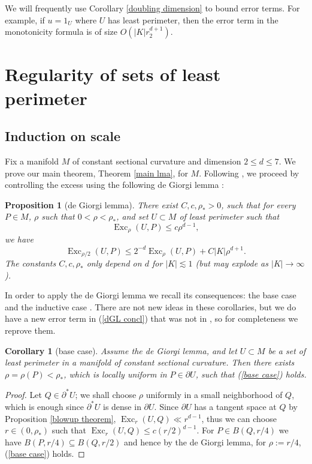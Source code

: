 \documentclass[reqno,11pt]{amsart}
\DeclareMathOperator{\Exc}{Exc}
\newtheorem{proposition}[theorem]{Proposition}
\newtheorem{corollary}[theorem]{Corollary}
\theoremstyle{definition}
\numberwithin{equation}{section}
\begin{document}
We will frequently use Corollary \ref{doubling dimension} to bound error terms.
For example, if $u = 1_U$ where $U$ has least perimeter, then the error term in the monotonicity formula is of size $O(|K|r_2^{d + 1})$.



\section{Regularity of sets of least perimeter}\label{Plateau section}
\subsection{Induction on scale}
Fix a manifold $M$ of constant sectional curvature and dimension $2 \leq d \leq 7$.
We prove our main theorem, Theorem \ref{main lma}, for $M$.
Following \cite{Miranda66,Giusti77,deGiorgi61}, we proceed by controlling the excess using the following de Giorgi lemma \cite[Theorem 8.1]{Giusti77}:

\begin{proposition}[de Giorgi lemma]\label{de Giorgi}
There exist $C, c, \rho_* > 0$, such that for every $P \in M$, $\rho$ such that $0 < \rho < \rho_*$, and set $U \subset M$ of least perimeter such that
\begin{equation}\label{base case}
\Exc_\rho(U, P) \leq c\rho^{d - 1},
\end{equation}
we have
\begin{equation}\label{dGL concl}
\Exc_{\rho/2}(U, P) \leq 2^{-d} \Exc_\rho(U, P) + C|K|\rho^{d + 1}.
\end{equation}
The constants $C, c, \rho_*$ only depend on $d$ for $|K| \lesssim 1$ (but may explode as $|K| \to \infty$).
\end{proposition}

In order to apply the de Giorgi lemma we recall its consequences: the base case \cite[pg109]{Giusti77} and the inductive case \cite[Corollary 8.3]{Giusti77}.
There are not new ideas in these corollaries, but we do have a new error term in (\ref{dGL concl}) that was not in \cite[Theorem 8.1]{Giusti77}, so for completeness we reprove them.

\begin{corollary}[base case]
Assume the de Giorgi lemma, and let $U \subset M$ be a set of least perimeter in a manifold of constant sectional curvature.
Then there exists $\rho = \rho(P) < \rho_*$, which is locally uniform in $P \in \partial U$, such that (\ref{base case}) holds.
\end{corollary}
\begin{proof}
Let $Q \in \partial^* U$; we shall choose $\rho$ uniformly in a small neighborhood of $Q$, which is enough since $\partial^* U$ is dense in $\partial U$.
Since $\partial U$ has a tangent space at $Q$ by Proposition \ref{blowup theorem}, $\Exc_r(U, Q) \ll r^{d - 1}$, thus we can choose $r \in (0, \rho_*)$ such that $\Exc_r(U, Q) \leq c(r/2)^{d - 1}$.
For $P \in B(Q, r/4)$ we have $B(P, r/4) \subseteq B(Q, r/2)$ and hence by the de Giorgi lemma, for $\rho := r/4$, (\ref{base case}) holds.
\end{proof}
\end{document}
